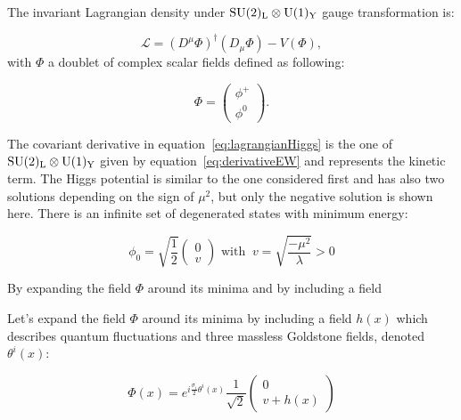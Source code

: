       The invariant Lagrangian density under $\rm{SU}(2)_{\rm{L}} \otimes \rm{U}(1)_{\rm{Y}}$ gauge transformation is:

      \begin{equation}
        \mathcal{L} = \left(D^{\mu} \Phi \right)^{\dagger} \left( D_{\mu} \Phi \right) - V(\Phi),
        \label{eq:lagrangianHiggs}
      \end{equation}    
      with $\Phi$ a doublet of complex scalar fields defined as following:
      
      \begin{equation}
         \Phi = \begin{pmatrix}
                  \phi^{+}\\
                  \phi^{0}
                \end{pmatrix}.
      \end{equation}

      The covariant derivative in equation~\ref{eq:lagrangianHiggs} is the one of $\rm{SU}(2)_{\rm{L}} \otimes \rm{U}(1)_{\rm{Y}}$ given by equation~\ref{eq:derivativeEW} and represents the kinetic term.
      The Higgs potential is similar to the one considered first and has also two solutions depending on the sign of $\mu^2$, but only the negative solution is shown here.
      There is an infinite set of degenerated states with minimum energy:

      \begin{equation}
        \phi_0 = \sqrt{\frac{1}{2}}
        \begin{pmatrix}
          0 \\
          v
        \end{pmatrix}
        \text{ with } \ v = \sqrt{\frac{- \mu^2}{\lambda}} > 0
        \label{eq:v2}
      \end{equation}
      
      By expanding the field $\Phi$ around its minima and by including a field 

      Let's expand the field $\Phi$ around its minima by including a field $h(x)$ which describes quantum fluctuations and three massless Goldstone fields, denoted $\theta^i(x)$:

      \begin{equation}
        \Phi(x) = e^{i\frac{\sigma_i}{2}\theta^i(x)} \frac{1}{\sqrt{2}}
                  \begin{pmatrix}
                     0 \\
                     v + h(x)
                   \end{pmatrix}
        \label{eq:fieldHiggs}
      \end{equation}
       
